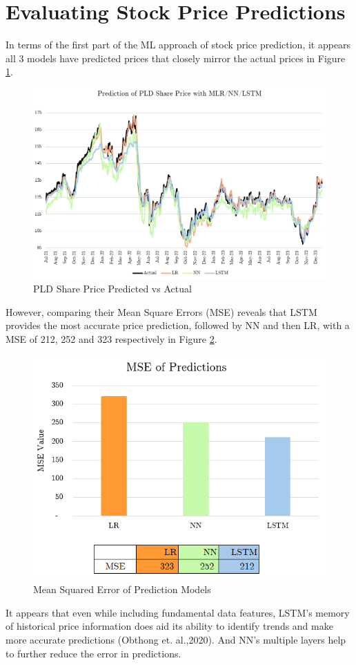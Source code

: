 \documentclass[a4paper,12pt]{report}
\numberwithin{equation}{section}
\theoremstyle{definition}
\begin{document}
\section{Evaluating Stock Price Predictions}
In terms of the first part of the ML approach of stock price prediction, it appears all 3 models have predicted prices that closely mirror the actual prices in Figure \ref{fig:PLD_price_pred}.
\begin{figure}[H]
  \centerline{\includegraphics[width=17cm]{ML Predictions PLD Price}}
  \caption{PLD Share Price Predicted vs Actual}
  \label{fig:PLD_price_pred}
\end{figure}
However, comparing their Mean Square Errors (MSE) reveals that LSTM provides the most accurate price prediction, followed by NN and then LR, with a MSE of 212, 252 and 323 respectively in Figure \ref{fig:MSE_ML}. 
\begin{figure}[H]
  \centerline{\includegraphics[width=13cm]{MSE of ML models}}
  \caption{Mean Squared Error of Prediction Models}
  \label{fig:MSE_ML}
\end{figure}
It appears that even while including fundamental data features, LSTM's memory of historical price information does aid its ability to identify trends and make more accurate predictions (Obthong et. al.,2020). And NN's multiple layers help to further reduce the error in predictions.
\end{document}
